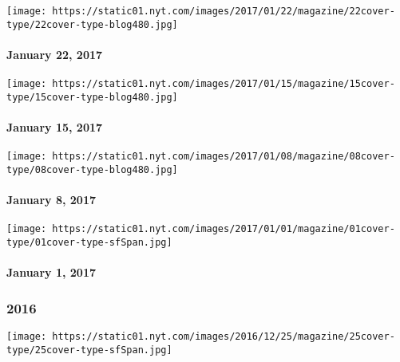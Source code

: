 \href{http://www.nytimes.com/issue/magazine/2017/01/22/magazine-index}{}

\texttt{[image: https://static01.nyt.com/images/2017/01/22/magazine/22cover-type/22cover-type-blog480.jpg]}

\hypertarget{january-22-2017}{%
\paragraph{January 22, 2017}\label{january-22-2017}}

\href{http://www.nytimes.com/issue/magazine/2017/01/15/magazine-index}{}

\texttt{[image: https://static01.nyt.com/images/2017/01/15/magazine/15cover-type/15cover-type-blog480.jpg]}

\hypertarget{january-15-2017}{%
\paragraph{January 15, 2017}\label{january-15-2017}}

\href{http://www.nytimes.com/issue/magazine/2017/01/08/magazine-index-2}{}

\texttt{[image: https://static01.nyt.com/images/2017/01/08/magazine/08cover-type/08cover-type-blog480.jpg]}

\hypertarget{january-8-2017}{%
\paragraph{January 8, 2017}\label{january-8-2017}}

\href{http://www.nytimes.com/indexes/2017/01/01/magazine/index.html}{}

\texttt{[image: https://static01.nyt.com/images/2017/01/01/magazine/01cover-type/01cover-type-sfSpan.jpg]}

\hypertarget{january-1-2017}{%
\paragraph{January 1, 2017}\label{january-1-2017}}

\hypertarget{2016}{%
\subsubsection{2016}\label{2016}}

\href{http://www.nytimes.com/indexes/2016/12/25/magazine/index.html}{}

\texttt{[image: https://static01.nyt.com/images/2016/12/25/magazine/25cover-type/25cover-type-sfSpan.jpg]}

